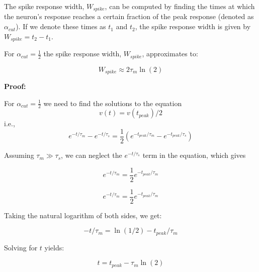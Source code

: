 The spike response width, $W_{spike}$, can be computed by finding the times at which the neuron's response reaches a certain fraction of the peak response (denoted as $\alpha_{cut}$). If we denote these times as $t_1$ and $t_2$, the spike response width is given by $W_{spike} = t_2 - t_1$.

\begin{mdframed}[backgroundcolor=red_background, linecolor=black, linewidth=2pt, frametitle=\textbf{Statement}]
\begin{center}

    \label{st:window-width}
    For $\alpha_{cut} = \frac{1}{2}$ the spike response width, $W_{spike}$, approximates to:

    \begin{equation}
        W_{spike} \approx 2\tau_m \ln(2)
    \end{equation}

\end{center}
\end{mdframed}


\textbf{Proof:}

For $\alpha_{cut} = \frac{1}{2}$ we need to find the solutions to the equation
\begin{equation}
    v(t) = v(t_{peak})/2
\end{equation}
i.e.,
\begin{equation}
e^{-t/\tau_m} - e^{-t/\tau_s} = \frac{1}{2}\left(e^{-t_{peak}/\tau_m} - e^{-t_{peak}/\tau_s}\right)
\end{equation}

Assuming $\tau_m \gg \tau_s$, we can neglect the $e^{-t/\tau_s}$ term in the equation, which gives

\begin{equation}
e^{-t/\tau_m} = \frac{1}{2} e^{-t_{peak}/\tau_m}
\end{equation}


\begin{equation}
e^{-t/\tau_m} = \frac{1}{2} e^{-t_{peak}/\tau_m}
\end{equation}

Taking the natural logarithm of both sides, we get:

\begin{equation}
-t/\tau_m = \ln(1/2) - t_{peak}/\tau_m
\end{equation}

Solving for $t$ yields:

\begin{equation}
t = t_{peak} - \tau_m \ln(2)
\end{equation}

